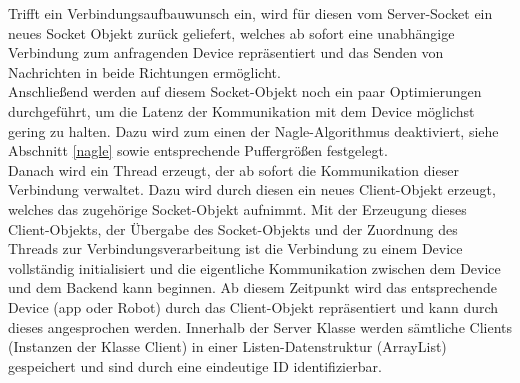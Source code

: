 \newpage
\noindent
Trifft ein Verbindungsaufbauwunsch ein, wird für diesen vom Server-Socket ein neues Socket Objekt zurück geliefert, welches 
ab sofort eine unabhängige Verbindung zum anfragenden Device repräsentiert und das Senden von Nachrichten in beide Richtungen 
ermöglicht.\\
Anschließend werden auf diesem Socket-Objekt noch ein paar Optimierungen durchgeführt, um die Latenz der Kommunikation mit dem
Device möglichst gering zu halten. Dazu wird zum einen der Nagle-Algorithmus deaktiviert, siehe Abschnitt \eqref{nagle} sowie entsprechende
Puffergrößen festgelegt. \\
Danach wird ein Thread erzeugt, der ab sofort die Kommunikation dieser Verbindung verwaltet. Dazu wird durch diesen ein neues Client-Objekt 
erzeugt, welches das zugehörige Socket-Objekt aufnimmt. Mit der Erzeugung dieses Client-Objekts, der Übergabe des Socket-Objekts und
der Zuordnung des Threads zur Verbindungsverarbeitung ist die Verbindung zu einem Device vollständig initialisiert und die eigentliche Kommunikation 
zwischen dem Device und dem Backend kann beginnen. 
Ab diesem Zeitpunkt wird das entsprechende Device (\gls{app} oder Robot) durch das Client-Objekt repräsentiert und kann durch dieses angesprochen werden. 
Innerhalb der Server Klasse werden sämtliche Clients (Instanzen der Klasse Client) in einer Listen-Datenstruktur (ArrayList) gespeichert 
und sind durch eine eindeutige ID identifizierbar.
